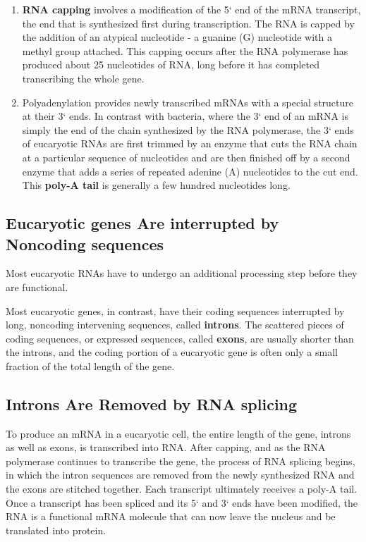 \begin{enumerate}
\item \textbf{RNA capping} involves a modification of the 5` end of the mRNA
transcript, the end that is synthesized first during transcription. The
RNA is capped by the addition of an atypical nucleotide - a guanine
(G) nucleotide with a methyl group attached. This capping occurs
after the RNA polymerase has produced about 25 nucleotides of
RNA, long before it has completed transcribing the whole gene.
\item Polyadenylation provides newly transcribed mRNAs with a special
structure at their 3` ends. In contrast with bacteria, where the 3`
end of an mRNA is simply the end of the chain synthesized by the
RNA polymerase, the 3` ends of eucaryotic RNAs are first trimmed
by an enzyme that cuts the RNA chain at a particular sequence of
nucleotides and are then finished off by a second enzyme that adds
a series of repeated adenine (A) nucleotides to the cut end. This
\textbf{poly-A tail} is generally a few hundred nucleotides long.
\end{enumerate}

\subsection{Eucaryotic genes Are interrupted by Noncoding sequences}

Most eucaryotic RNAs have to undergo an additional processing step
before they are functional.

Most eucaryotic genes, in contrast, have their coding sequences interrupted
by long, noncoding intervening sequences, called \textbf{introns}. The scattered pieces
of coding sequences, or expressed sequences, called \textbf{exons}, are usually shorter than
the introns, and the coding portion of a eucaryotic gene is often only a
small fraction of the total length of the gene.

\subsection{Introns Are Removed by RNA splicing}

To produce an mRNA in a eucaryotic cell, the entire length of the gene,
introns as well as exons, is transcribed into RNA. After capping, and as
the RNA polymerase continues to transcribe the gene, the process of RNA
splicing begins, in which the intron sequences are removed from the
newly synthesized RNA and the exons are stitched together. Each transcript
ultimately receives a poly-A tail.
Once a transcript has been spliced and its 5` and
3` ends have been modified, the RNA is a functional mRNA molecule that
can now leave the nucleus and be translated into protein.

